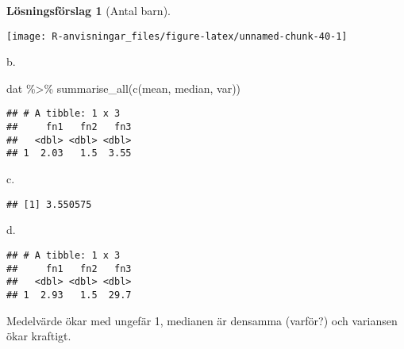 \documentclass[
]{book}
\newenvironment{Shaded}{\begin{snugshade}}{\end{snugshade}}
\newcommand{\AttributeTok}[1]{\textcolor[rgb]{0.77,0.63,0.00}{#1}}
\newcommand{\CommentTok}[1]{\textcolor[rgb]{0.56,0.35,0.01}{\textit{#1}}}
\newcommand{\DecValTok}[1]{\textcolor[rgb]{0.00,0.00,0.81}{#1}}
\newcommand{\FunctionTok}[1]{\textcolor[rgb]{0.00,0.00,0.00}{#1}}
\newcommand{\NormalTok}[1]{#1}
\newcommand{\OtherTok}[1]{\textcolor[rgb]{0.56,0.35,0.01}{#1}}
\newcommand{\SpecialCharTok}[1]{\textcolor[rgb]{0.00,0.00,0.00}{#1}}
\newcommand{\StringTok}[1]{\textcolor[rgb]{0.31,0.60,0.02}{#1}}
\theoremstyle{definition}
\theoremstyle{definition}
\theoremstyle{definition}
\theoremstyle{definition}
\newtheorem{hypothesis}{Lösningsförslag}[chapter]
\theoremstyle{remark}
\begin{document}
\begin{hypothesis}[Antal barn]
\begin{center}\texttt{[image: R-anvisningar\_files/figure-latex/unnamed-chunk-40-1]} \end{center}

b.

\begin{Shaded}
\begin{Highlighting}[]
\NormalTok{dat }\SpecialCharTok{\%\textgreater{}\%} \FunctionTok{summarise\_all}\NormalTok{(}\FunctionTok{c}\NormalTok{(mean, median, var))}
\end{Highlighting}
\end{Shaded}

\begin{verbatim}
## # A tibble: 1 x 3
##     fn1   fn2   fn3
##   <dbl> <dbl> <dbl>
## 1  2.03   1.5  3.55
\end{verbatim}

c.

\begin{Shaded}
\end{Shaded}

\begin{verbatim}
## [1] 3.550575
\end{verbatim}

d.

\begin{Shaded}
\end{Shaded}

\begin{verbatim}
## # A tibble: 1 x 3
##     fn1   fn2   fn3
##   <dbl> <dbl> <dbl>
## 1  2.93   1.5  29.7
\end{verbatim}

Medelvärde ökar med ungefär 1, medianen är densamma (varför?) och variansen ökar kraftigt.
\end{hypothesis}
\end{document}
